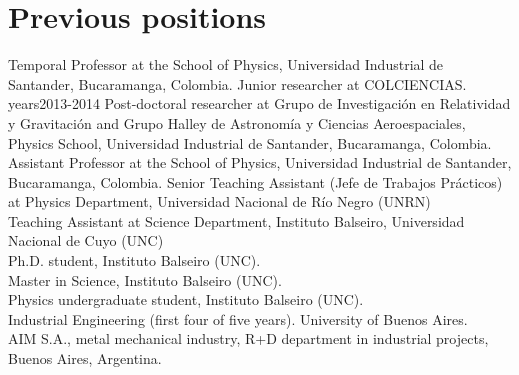 \ifeng
\section*{Previous positions}
\noindent
{} Temporal Professor at the School of Physics, Universidad Industrial de Santander, Bucaramanga, Colombia. Junior researcher at COLCIENCIAS.
years{2013-2014} Post-doctoral researcher at Grupo de Investigación en Relatividad y Gravitación and Grupo Halley de Astronomía y Ciencias Aeroespaciales, Physics School, Universidad Industrial de Santander, Bucaramanga, Colombia.
 Assistant Professor at the School of Physics, Universidad Industrial de Santander, Bucaramanga, Colombia.
 Senior Teaching Assistant (Jefe de Trabajos Prácticos) at Physics Department, Universidad Nacional de Río Negro (UNRN)\\
 Teaching Assistant at Science Department, Instituto Balseiro, Universidad Nacional de Cuyo (UNC)\\
Ph.D. student, Instituto Balseiro (UNC).\\
Master in Science, Instituto Balseiro (UNC).\\
Physics undergraduate student, Instituto Balseiro (UNC).\\
Industrial Engineering (first four of five years). University of Buenos Aires.\\
AIM S.A., metal mechanical industry, R+D department in industrial projects, Buenos Aires, Argentina.\\
\else
